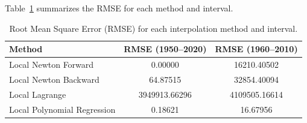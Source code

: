 Table~\ref{tab:rmse} summarizes the RMSE for each method and interval.

\begin{table}[htbp]
    \centering
    \begin{tabular}{lcc}
        \hline
        Method & RMSE (1950--2020) & RMSE (1960--2010) \\
        \hline
        Local Newton Forward & 0.00000 & 16210.40502 \\
        Local Newton Backward & 64.87515 & 32854.40094 \\
        Local Lagrange & 3949913.66296 & 4109505.16614 \\
        Local Polynomial Regression & 0.18621 & 16.67956 \\
        \hline
    \end{tabular}
    \caption{Root Mean Square Error (RMSE) for each interpolation method and interval.}
    \label{tab:rmse}
\end{table}